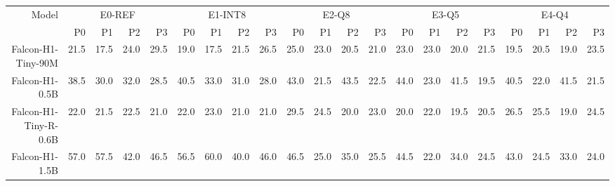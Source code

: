 \documentclass[letterpaper]{article} %
\begin{document}
\begin{table}[t]
\begin{tabular}{rrrrr|rrrr|rrrr|rrrr|rrrr}
\toprule
\multirow{2}{*}{Model} & \multicolumn{4}{c}{E0-REF} & \multicolumn{4}{c}{E1-INT8} & \multicolumn{4}{c}{E2-Q8} & \multicolumn{4}{c}{E3-Q5} & \multicolumn{4}{c}{E4-Q4} \\
\cmidrule(lr){2-5} \cmidrule(lr){6-9} \cmidrule(lr){10-13} \cmidrule(lr){14-17} \cmidrule(lr){18-21}
 & P0 & P1 & P2 & P3 & P0 & P1 & P2 & P3 & P0 & P1 & P2 & P3 & P0 & P1 & P2 & P3 & P0 & P1 & P2 & P3 \\
\midrule
Falcon-H1-Tiny-90M& \cellcolor[HTML]{F9D2CC}21.5 & \cellcolor[HTML]{F8CCCC}17.5 & \cellcolor[HTML]{FAD6CC}24.0 & \cellcolor[HTML]{FBDECC}29.5 & \cellcolor[HTML]{F9CFCC}19.0 & \cellcolor[HTML]{F8CDCC}17.5 & \cellcolor[HTML]{F9D3CC}21.5 & \cellcolor[HTML]{FBDACC}26.5 & \cellcolor[HTML]{FAD5CC}25.0 & \cellcolor[HTML]{F9D2CC}23.0 & \cellcolor[HTML]{F8CECC}20.5 & \cellcolor[HTML]{F9CFCC}21.0 & \cellcolor[HTML]{F9D2CC}23.0 & \cellcolor[HTML]{F9D2CC}23.0 & \cellcolor[HTML]{F8CDCC}20.0 & \cellcolor[HTML]{F9CFCC}21.5 & \cellcolor[HTML]{F8CDCC}19.5 & \cellcolor[HTML]{F8CECC}20.5 & \cellcolor[HTML]{F8CCCC}19.0 & \cellcolor[HTML]{F9D3CC}23.5 \\
Falcon-H1-0.5B& \cellcolor[HTML]{FEECCC}38.5 & \cellcolor[HTML]{FBDFCC}30.0 & \cellcolor[HTML]{FCE2CC}32.0 & \cellcolor[HTML]{FBDDCC}28.5 & \cellcolor[HTML]{FFF0CC}40.5 & \cellcolor[HTML]{FCE4CC}33.0 & \cellcolor[HTML]{FCE1CC}31.0 & \cellcolor[HTML]{FBDDCC}28.0 & \cellcolor[HTML]{FFF0CC}43.0 & \cellcolor[HTML]{F9D0CC}21.5 & \cellcolor[HTML]{FFF1CC}43.5 & \cellcolor[HTML]{F9D1CC}22.5 & \cellcolor[HTML]{FCF1CC}44.0 & \cellcolor[HTML]{F9D2CC}23.0 & \cellcolor[HTML]{FFF0CC}41.5 & \cellcolor[HTML]{F8CCCC}19.5 & \cellcolor[HTML]{FFF0CC}40.5 & \cellcolor[HTML]{F9D1CC}22.0 & \cellcolor[HTML]{FFF1CC}41.5 & \cellcolor[HTML]{F9D0CC}21.5 \\
Falcon-H1-Tiny-R-0.6B & \cellcolor[HTML]{F9D3CC}22.0 & \cellcolor[HTML]{F9D2CC}21.5 & \cellcolor[HTML]{F9D4CC}22.5 & \cellcolor[HTML]{F9D1CC}21.0 & \cellcolor[HTML]{F9D4CC}22.0 & \cellcolor[HTML]{FAD5CC}23.0 & \cellcolor[HTML]{F9D2CC}21.0 & \cellcolor[HTML]{F9D2CC}21.0 & \cellcolor[HTML]{FBDCCC}29.5 & \cellcolor[HTML]{FAD4CC}24.5 & \cellcolor[HTML]{F8CECC}20.0 & \cellcolor[HTML]{F9D2CC}23.0 & \cellcolor[HTML]{F8CDCC}20.0 & \cellcolor[HTML]{F9D0CC}22.0 & \cellcolor[HTML]{F8CCCC}19.5 & \cellcolor[HTML]{F8CECC}20.5 & \cellcolor[HTML]{FAD8CC}26.5 & \cellcolor[HTML]{FAD7CC}25.5 & \cellcolor[HTML]{F8CCCC}19.0 & \cellcolor[HTML]{FAD5CC}24.5 \\
Falcon-H1-1.5B & \cellcolor[HTML]{E2ECCC}57.0 & \cellcolor[HTML]{E1ECCC}57.5 & \cellcolor[HTML]{FFF1CC}42.0 & \cellcolor[HTML]{F7F1CC}46.5 & \cellcolor[HTML]{E1ECCC}56.5 & \cellcolor[HTML]{DAEBCC}60.0 & \cellcolor[HTML]{FEEFCC}40.0 & \cellcolor[HTML]{F7F0CC}46.0 & \cellcolor[HTML]{FAF1CC}46.5 & \cellcolor[HTML]{FAD5CC}25.0 & \cellcolor[HTML]{FCE4CC}35.0 & \cellcolor[HTML]{FAD6CC}25.5 & \cellcolor[HTML]{FBF1CC}44.5 & \cellcolor[HTML]{F9D0CC}22.0 & \cellcolor[HTML]{FCE4CC}34.0 & \cellcolor[HTML]{FAD4CC}24.5 & \cellcolor[HTML]{FDF2CC}43.0 & \cellcolor[HTML]{FAD5CC}24.5 & \cellcolor[HTML]{FCE3CC}33.0 & \cellcolor[HTML]{FAD4CC}24.0 \\

\end{tabular}
\end{table}
\end{document}
